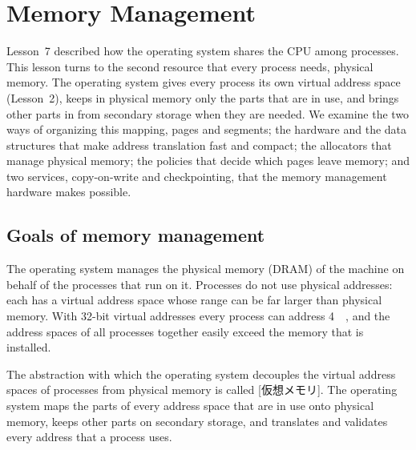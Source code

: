 \documentclass[../main.tex]{subfiles}
\begin{document}
\chapter{Memory Management}

Lesson~7 described how the operating system shares the CPU among processes.
This lesson turns to the second resource that every process needs, physical
memory.  The operating system gives every process its own virtual address
space (Lesson~2), keeps in physical memory only the parts that are in use,
and brings other parts in from secondary storage when they are needed.  We
examine the two ways of organizing this mapping, pages and segments; the
hardware and the data structures that make address translation fast and
compact; the allocators that manage physical memory; the policies that
decide which pages leave memory; and two services, copy-on-write and
checkpointing, that the memory management hardware makes possible.

\section{Goals of memory management}
\label{sec:l08-goals}

The operating system manages the physical memory (DRAM) of the machine on
behalf of the processes that run on it.  Processes do not use physical
addresses: each has a virtual address space whose range can be far larger
than physical memory.  With 32-bit virtual addresses every process can
address \SI{4}{\gibi\byte}, and the address spaces of all processes
together easily exceed the memory that is installed.

\begin{definition}
  The abstraction with which the operating system decouples the virtual
  address spaces of processes from physical memory is called
  [仮想メモリ].  The operating system maps the parts
  of every address space that are in use onto physical memory, keeps other
  parts on secondary storage, and translates and validates every address
  that a process uses.
\end{definition}
\end{document}
